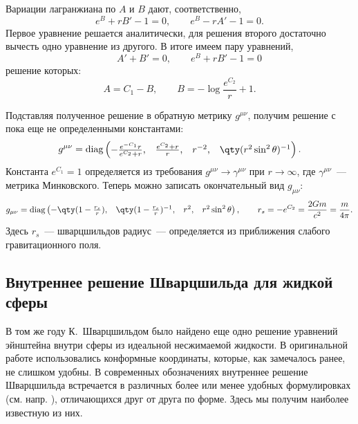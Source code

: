 \documentclass[\docroot/reports/draft/report.tex]{subfiles}
\begin{document}
    Вариации лагранжиана по $A$ и $B$ дают, соответственно,
    \begin{equation*}
        e^B + r B' - 1 = 0 , \qquad e^B - r A' - 1 = 0 .
    \end{equation*}
    Первое уравнение решается аналитически, для решения второго достаточно вычесть одно уравнение из другого. В итоге имеем пару уравнений,
    \begin{equation*}
        \qquad A' + B' = 0 , \qquad e^B + r B' - 1 = 0
    \end{equation*}
    решение которых:
    \begin{equation*}
        A = C_1 - B , \qquad B = - \log{\frac{e^{C_2}}{r} + 1} .
    \end{equation*}

    Подставляя полученное решение в обратную метрику $g^{\mu\nu}$, получим решение с пока еще не определенными константами:
    \begin{equation*}
        g^{\mu\nu} = \text{diag} \begin{pmatrix}
            -\frac{e^{-C_1} r}{e^{C_2} + r},&
            \frac{e^{C_2} + r}{r},&
            r^{-2},&
            \qty(r^2 \sin^2\theta)^{-1}
        \end{pmatrix} .
    \end{equation*}
    Константа $e^{C_1} = 1$ определяется из требования $g^{\mu\nu} \to \gamma^{\mu\nu}$ при $r \to \infty$, где $\gamma^{\mu\nu}$~--- метрика Минковского. Теперь можно записать окончательный вид $g_{\mu\nu}$:
    \begin{equation*}
        g_{\mu\nu} = \text{diag} \begin{pmatrix}
            - \qty(1 - \frac{r_s}{r}),&
            \qty(1 - \frac{r_s}{r})^{-1},&
            r^2,&
            r^2 \sin^2\theta
        \end{pmatrix} , \qquad r_s = - e^{C_2} = \frac{2 G m}{c^2} = \frac{m}{4 \pi} .
    \end{equation*}
    Здесь $r_s$~--- шварцшильдов радиус~--- определяется из приближения слабого гравитационного поля.

\subsection{Внутреннее решение Шварцшильда для жидкой сферы}

    В том же году К.~Шварцшильдом \cite{schwarzschild_fluid} было найдено еще одно решение уравнений эйнштейна внутри сферы из идеальной несжимаемой жидкости. В оригинальной работе использовались конформные координаты, которые, как замечалось ранее, не слишком удобны. В современных обозначениях внутреннее решение Шварцшильда встречается в различных более или менее удобных формулировках (см. напр. \cite{delgaty_lake_solution_list,cambridge_exact_solutions,boonserm_exact_solutions}), отличающихся друг от друга по форме. Здесь мы получим наиболее известную из них.
\end{document}
